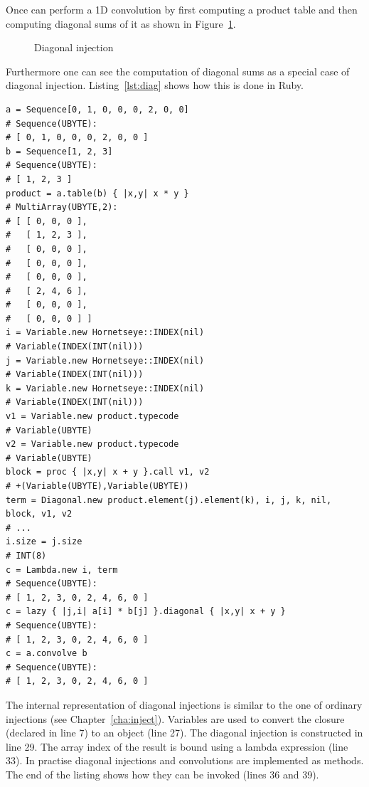 \documentclass[12pt,a4paper,oneside,openright]{book}
\newcommand{\cha}[1]{Chapter~\ref{cha:#1}}
\newcommand{\fig}[1]{Figure~\ref{fig:#1}}
\newcommand{\lst}[1]{Listing~\ref{lst:#1}}
\begin{document}
\begin{CJK}{UTF8}{}
Once can perform a \ac{1D} convolution by first computing a product table and then computing diagonal sums of it as shown in \fig{diag}.
\begin{figure}[htbp]
  \begin{center}
    \caption{Diagonal injection\label{fig:diag}}
  \end{center}
\end{figure}
Furthermore one can see the computation of diagonal sums as a special case of diagonal injection. \lst{diag} shows how this is done in Ruby.
\lstset{language=Ruby,frame=single,numbers=left}
\begin{lstlisting}[float,caption={One-dimensional convolutions in Ruby},label=lst:diag]
a = Sequence[0, 1, 0, 0, 0, 2, 0, 0]
# Sequence(UBYTE):
# [ 0, 1, 0, 0, 0, 2, 0, 0 ]
b = Sequence[1, 2, 3]
# Sequence(UBYTE):
# [ 1, 2, 3 ]
product = a.table(b) { |x,y| x * y }
# MultiArray(UBYTE,2):
# [ [ 0, 0, 0 ],
#   [ 1, 2, 3 ],
#   [ 0, 0, 0 ],
#   [ 0, 0, 0 ],
#   [ 0, 0, 0 ],
#   [ 2, 4, 6 ],
#   [ 0, 0, 0 ],
#   [ 0, 0, 0 ] ]
i = Variable.new Hornetseye::INDEX(nil)
# Variable(INDEX(INT(nil)))
j = Variable.new Hornetseye::INDEX(nil)
# Variable(INDEX(INT(nil)))
k = Variable.new Hornetseye::INDEX(nil)
# Variable(INDEX(INT(nil)))
v1 = Variable.new product.typecode
# Variable(UBYTE)
v2 = Variable.new product.typecode
# Variable(UBYTE)
block = proc { |x,y| x + y }.call v1, v2
# +(Variable(UBYTE),Variable(UBYTE))
term = Diagonal.new product.element(j).element(k), i, j, k, nil, block, v1, v2
# ...
i.size = j.size
# INT(8)
c = Lambda.new i, term
# Sequence(UBYTE):
# [ 1, 2, 3, 0, 2, 4, 6, 0 ]
c = lazy { |j,i| a[i] * b[j] }.diagonal { |x,y| x + y }
# Sequence(UBYTE):
# [ 1, 2, 3, 0, 2, 4, 6, 0 ]
c = a.convolve b
# Sequence(UBYTE):
# [ 1, 2, 3, 0, 2, 4, 6, 0 ]
\end{lstlisting}
The internal representation of diagonal injections is similar to the one of ordinary injections (see \cha{inject}). Variables are used to convert the closure (declared in line 7) to an object (line 27). The diagonal injection is constructed in line 29. The array index of the result is bound using a lambda expression (line 33). In practise diagonal injections and convolutions are implemented as methods. The end of the listing shows how they can be invoked (lines 36 and 39).


\end{CJK}
\end{document}
